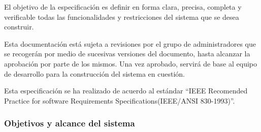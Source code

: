 El objetivo de la especificación es definir en forma clara, precisa, completa y verificable todas las funcionalidades y restricciones del sistema que se desea construir.

Esta documentación está sujeta a revisiones por el grupo de administradores que se recogerán por medio de sucesivas versiones del documento, hasta alcanzar la aprobación por parte de los mismos. Una vez aprobado, servirá de base al equipo de desarrollo para la construcción del sistema en cuestión.

Esta especificación se ha realizado de acuerdo al estándar “IEEE Recomended Practice for software Requirements Specifications(IEEE/ANSI 830-1993)”.

 
    \subsubsection{Objetivos y alcance del sistema}

